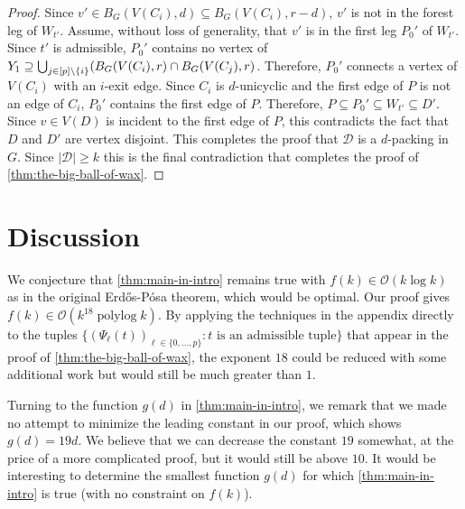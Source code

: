\documentclass{patmorin}
\DeclareMathOperator{\polylog}{polylog}
\newcommand{\Oh}{\mathcal{O}}
\DeclarePairedDelimiter\set{\{}{\}}
\begin{document}
\begin{proof}
  Since $v'\in B_G(V(C_i),d)\subseteq B_G(V(C_i),r-d)$, $v'$ is not in the forest leg of $W_{t'}$. Assume, without loss of generality, that $v'$ is in the first leg $P_0'$ of $W_{t'}$. Since $t'$ is admissible, $P_0'$ contains no vertex of $Y_1\supseteq \bigcup_{j\in[p]\setminus \set{i}} (B_G(V(C_i),r)\cap B_G(V(C_j),r)$. Therefore, $P_0'$ connects a vertex of $V(C_i)$ with an $i$-exit edge.  Since $C_i$ is $d$-unicyclic and the first edge of $P$ is not an edge of $C_i$, $P_0'$ contains the first edge of $P$. Therefore, $P\subseteq P_0'\subseteq W_{t'}\subseteq D'$.  Since $v\in V(D)$ is incident to the first edge of $P$, this contradicts the fact that $D$ and $D'$ are vertex disjoint. This completes the proof that $\mathcal{D}$ is a $d$-packing in $G$. Since $|\mathcal{D}|\geq k$ this is the final contradiction that completes the proof of \cref{thm:the-big-ball-of-wax}.
\end{proof}

\section{Discussion}

We conjecture that \cref{thm:main-in-intro} remains true with $f(k)\in\Oh(k \log k)$ as in the original Erd\H{o}s-P\'osa theorem, which would be optimal. Our proof gives $f(k)\in\Oh(k^{18}\polylog k)$. By applying the techniques in the appendix directly to the tuples $\{(\Psi_\ell(t))_{\ell\in\{0,\ldots,p\}}:\text{$t$ is an admissible tuple}\}$ that appear in the proof of \cref{thm:the-big-ball-of-wax}, the exponent $18$ could be reduced with some additional work but would still be much greater than $1$.





Turning to the function $g(d)$ in  \cref{thm:main-in-intro}, we remark that we made no attempt to minimize the leading constant in our proof, which shows $g(d)=19d$. We believe that we can decrease the constant $19$ somewhat, at the price of a more complicated proof, but it would still be above $10$. It would be interesting to determine the smallest function $g(d)$ for which \cref{thm:main-in-intro} is true (with no constraint on $f(k)$).
\end{document}
